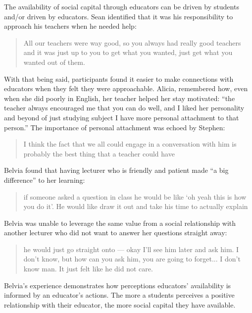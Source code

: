 The availability of social capital through educators can be driven by students and/or driven by educators. Sean identified that it was his responsibility to approach his teachers when he needed help: \blockquote{All our teachers were way good, so you always had really good teachers and it was just up to you to get what you wanted, just get what you wanted out of them.} With that being said, participants found it easier to make connections with educators when they felt they were approachable. Alicia, remembered how, even when she did poorly in English, her teacher helped her stay motivated: ``the teacher always encouraged me that you can do well, and I liked her personality and beyond of just studying subject I have more personal attachment to that person.'' The importance of personal attachment was echoed by Stephen: \blockquote{I think the fact that we all could engage in a conversation with him is probably the best thing that a teacher could have}. Belvia found that having lecturer who is friendly and patient made ``a big difference'' to her learning: \blockquote{if someone asked a question in class he would be like `oh yeah this is how you do it'. He would like draw it out and take his time to actually explain}. Belvia was unable to leverage the same value from a social relationship with another lecturer who did not want to answer her questions straight away: \blockquote{he would just go straight onto --- okay I'll see him later and ask him. I don't know, but how can you ask him, you are going to forget... I don't know man. It just felt like he did not care.} Belvia's experience demonstrates how perceptions educators' availability is informed by an educator's actions. The more a students perceives a positive relationship with their educator, the more social capital they have available. 

